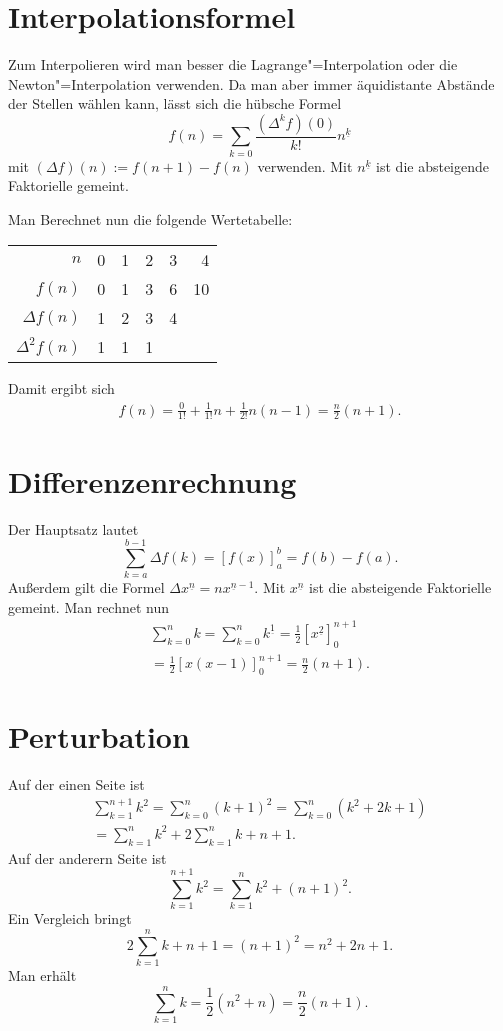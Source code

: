\documentclass[a4paper,10pt,fleqn,twocolumn,twoside]{scrartcl}
\begin{document}
\section{Interpolationsformel}

Zum Interpolieren wird man besser die Lagrange"=Interpolation oder
die Newton"=Interpolation verwenden. Da man aber immer äquidistante
Abstände der Stellen wählen kann, lässt sich die hübsche Formel%
\[f(n) = \sum_{k=0} \frac{(\Delta^k f)(0)}{k!}n^{\underline k}\]
mit $(\Delta f)(n):=f(n+1)-f(n)$ verwenden.
Mit $n^{\underline k}$ ist die absteigende Faktorielle gemeint.

Man Berechnet nun die folgende Wertetabelle:
\begin{table}[h!]
\qquad\begin{tabular}{@{\;}rrrrrr@{\;}}
\toprule
$n$    & 0 & 1 & 2 & 3 & 4\\
$f(n)$ & 0 & 1 & 3 & 6 & 10\\
$\Delta f(n)$ & 1 & 2 & 3 & 4\\
$\Delta^2 f(n)$ & 1 & 1 & 1\\
\bottomrule
\end{tabular}
\end{table}

\noindent
Damit ergibt sich
\begin{gather*}
f(n) = \frac{0}{1!} + \frac{1}{1!}n + \frac{1}{2!}n(n-1)
= \frac{n}{2}(n+1).
\end{gather*}

\section{Differenzenrechnung}

Der Hauptsatz lautet
\[\sum_{k=a}^{b-1} \Delta f(k) = [f(x)]_a^b = f(b)-f(a).\]
Außerdem gilt die Formel $\Delta x^{\underline n} = nx^{\underline n-1}$.
Mit $x^{\underline n}$ ist die absteigende Faktorielle gemeint.
Man rechnet nun%
\begin{gather*}\sum_{k=0}^{n} k = \sum_{k=0}^{n} k^{\underline 1}
= \frac{1}{2}[x^{\underline{2}}]_0^{n+1}\\
= \frac{1}{2}[x(x-1)]_0^{n+1}
= \frac{n}{2}(n+1).
\end{gather*}

\section{Perturbation}

Auf der einen Seite ist
\begin{gather*}
\sum_{k=1}^{n+1} k^2 = \sum_{k=0}^n (k+1)^2
= \sum_{k=0}^n (k^2+2k+1)\\
= \sum_{k=1}^n k^2 + 2\sum_{k=1}^n k + n+1.
\end{gather*}
Auf der anderern Seite ist
\[\sum_{k=1}^{n+1} k^2 = \sum_{k=1}^n k^2 + (n+1)^2.\]
Ein Vergleich bringt
\[2\sum_{k=1}^n k +n+1 = (n+1)^2 = n^2+2n+1.\]
Man erhält
\[\sum_{k=1}^n k = \frac{1}{2}(n^2+n) = \frac{n}{2}(n+1).\]
\end{document}
